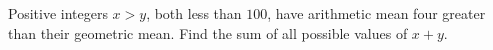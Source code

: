 Positive integers $x>y$, both less than $100$, have arithmetic mean four greater than their geometric mean. Find the sum of all possible values of $x+y$.
